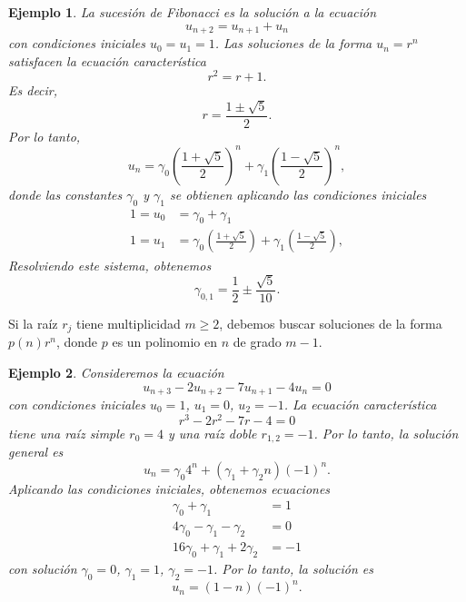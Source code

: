 \documentclass[11pt,letterpaper]{report}
\newtheorem{example}{Ejemplo}
\begin{document}
\begin{example}
  La sucesión de Fibonacci es la solución a la ecuación
  \begin{equation}
    u_{n+2} = u_{n+1} + u_n
  \end{equation}
  con condiciones iniciales $u_0=u_1=1$.
  Las soluciones de la forma $u_n=r^n$ satisfacen la ecuación
  característica
  \begin{equation}
    r^2 = r + 1
  .\end{equation}
  Es decir,
  \begin{equation}
    r = \frac{1\pm\sqrt 5}{2}
  .\end{equation}
  Por lo tanto,
  \begin{equation}
    u_n = \gamma_0
    \left( \frac{1+\sqrt 5}{2} \right)^n
    +
    \gamma_1
    \left( \frac{1-\sqrt 5}{2} \right)^n
  ,\end{equation}
  donde las constantes $\gamma_0$ y $\gamma_1$ se obtienen aplicando
  las condiciones iniciales
  \begin{align}
    1 = u_0 &= \gamma_0
    +
    \gamma_1
    \\
    1 = u_1 &= \gamma_0
    \left( \frac{1+\sqrt 5}{2} \right)
    +
    \gamma_1
    \left( \frac{1-\sqrt 5}{2} \right)
  ,\end{align}
  Resolviendo este sistema, obtenemos
  \begin{equation}
    \gamma_{0,1} = \frac{1}{2} \pm \frac{\sqrt 5}{10}
  .\end{equation}
\end{example}

Si la raíz $r_j$ tiene multiplicidad $m\geq 2$, debemos buscar
soluciones de la forma $p(n)r^n$, donde $p$ es un polinomio en $n$ de
grado $m-1$.

\begin{example}
  Consideremos la ecuación
  \begin{equation}
    u_{n+3} -2u_{n+2} - 7 u_{n+1} - 4u_n = 0
  \end{equation}
  con condiciones iniciales $u_0=1$, $u_1=0$, $u_{2}=-1$.
  La ecuación característica
  \begin{equation}
    r^{3}-2r^{2}-7r-4 = 0
  \end{equation}
  tiene una raíz simple $r_0=4$ y una raíz doble $r_{1,2}=-1$.
  Por lo tanto, la solución general es
  \begin{equation}
    u_n = \gamma_{0}4^n + (\gamma_1+\gamma_2n)(-1)^n
  .\end{equation}
  Aplicando las condiciones iniciales, obtenemos ecuaciones
  \begin{align}
    \gamma_0+\gamma_1 &= 1 \\
    4\gamma_0-\gamma_1-\gamma_2 &= 0 \\
    16\gamma_0+\gamma_1+2\gamma_2&= -1
  \end{align}
  con solución $\gamma_0=0$, $\gamma_1=1$, $\gamma_2=-1$.
  Por lo tanto, la solución es
  \begin{equation}
    u_n = (1-n)(-1)^{n}
  .\end{equation}
\end{example}
\end{document}
